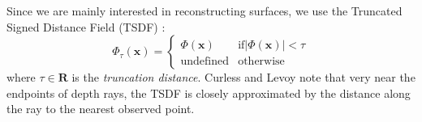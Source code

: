 \documentclass[conference]{IEEEtran}
\newcommand{\eref}[1]{(\ref{#1})}
\newcommand{\figref}[1]{Fig.\ref{#1}}
\newcommand{\TSDF}{TSDF\xspace}
\begin{document}
Since we are mainly interested in reconstructing surfaces,
we use the Truncated Signed Distance Field (\TSDF) \cite{Curless1996}:
\begin{equation}
	\Phi_{\tau}(\mathbf{x}) =
	\begin{cases}
		\Phi(\mathbf{x}) &  \text{if} |\Phi(\mathbf{x})| < \tau \\
		\text{undefined} & \text{otherwise}
	\end{cases}
\end{equation}
where $\tau \in \mathbf{R}$ is the \emph{truncation distance}.  Curless and
Levoy \cite{Curless1996} note that very near the endpoints of depth rays, the
\TSDF is closely approximated by the distance along the ray to the nearest observed
point.   
 
% 
% 
% 
\end{document}
